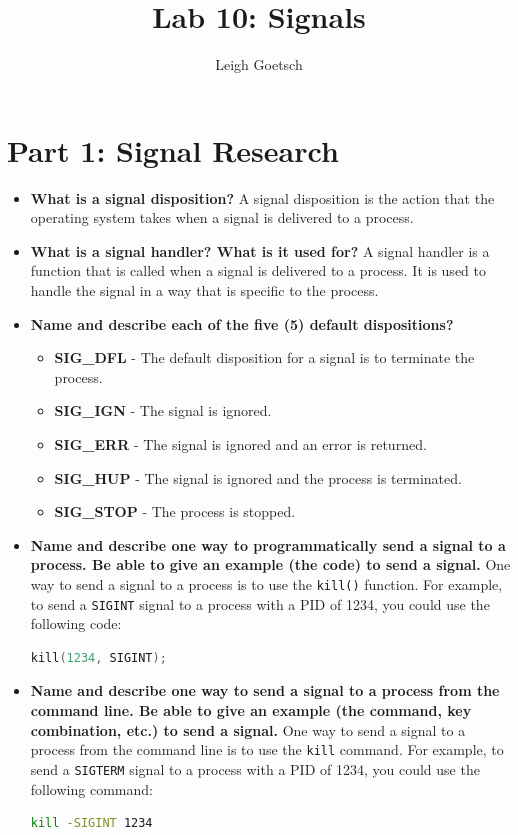 \documentclass{assignment}
\author{Leigh Goetsch}
\title{Lab 10: Signals}
\begin{document}
\maketitle

\newpage


\section{Part 1: Signal Research}

\begin{itemize}
    \item \textbf{What is a signal disposition?} A signal disposition is the action that the operating system takes when a signal is delivered to a process.
    \item \textbf{What is a signal handler? What is it used for?} A signal handler is a function that is called when a signal is delivered to a process. It is used to handle the signal in a way that is specific to the process.
    \item \textbf{Name and describe each of the five (5) default dispositions?}
    \begin{itemize}
        \item \textbf{SIG\_DFL} - The default disposition for a signal is to terminate the process.
        \item \textbf{SIG\_IGN} - The signal is ignored.
        \item \textbf{SIG\_ERR} - The signal is ignored and an error is returned.
        \item \textbf{SIG\_HUP} - The signal is ignored and the process is terminated.
        \item \textbf{SIG\_STOP} - The process is stopped.
    \end{itemize}
    \item \textbf{Name and describe one way to programmatically send a signal to a process. Be able to give an example (the code) to send a signal.} One way to send a signal to a process is to use the \texttt{kill()} function. For example, to send a \texttt{SIGINT} signal to a process with a PID of 1234, you could use the following code:
    \begin{lstlisting}[language=C]
    kill(1234, SIGINT);
    \end{lstlisting}
    \item \textbf{Name and describe one way to send a signal to a process from the command line. Be able to give an example (the command, key combination, etc.) to send a signal.} One way to send a signal to a process from the command line is to use the \texttt{kill} command. For example, to send a \texttt{SIGTERM} signal to a process with a PID of 1234, you could use the following command:
    \begin{lstlisting}[language=bash]
    kill -SIGINT 1234
    \end{lstlisting}
\end{itemize}
\end{document}
